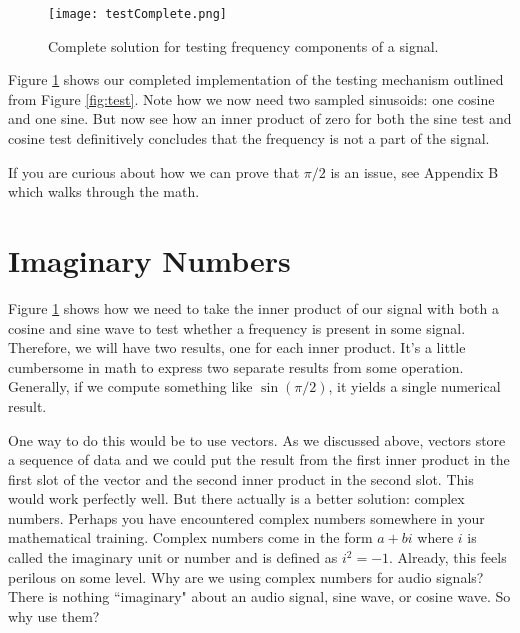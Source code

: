 \begin{figure}[h]
	\caption{Complete solution for testing frequency components of a signal.}
	\centering
	\texttt{[image: testComplete.png]}
	\label{fig:testComplete}
\end{figure}

Figure \ref{fig:testComplete} shows our completed implementation of the testing mechanism outlined from
Figure \ref{fig:test}.  Note how we now need two sampled sinusoids: one cosine and one sine.  But now see
how an inner product of zero for both the sine test and cosine test definitively concludes that the frequency
is not a part of the signal.

If you are curious about how we can prove that $\pi/2$ is an issue, see Appendix B which walks through the math.

\section*{Imaginary Numbers}

Figure \ref{fig:testComplete} shows how we need to take the inner product of our signal with both a cosine and
sine wave to test whether a frequency is present in some signal.  Therefore, we will have two results, one for
each inner product.  It's a little cumbersome in math to express two separate results from some operation.  
Generally, if we compute something like $\sin(\pi/2)$, it yields a single numerical result.  

One way to do this would be to use vectors.  As we discussed above, vectors store a sequence of data and we
could put the result from the first inner product in the first slot of the vector and the second inner product in 
the second slot.  This would work perfectly well.  But there actually is a better solution: complex numbers.
Perhaps you have encountered complex numbers somewhere in your mathematical training.  Complex numbers
come in the form $a + bi$ where $i$ is called the imaginary unit or number and is defined as $i^2 = -1$.  Already,
this feels perilous on some level.  Why are we using complex numbers for audio signals?  There is nothing
``imaginary" about an audio signal, sine wave, or cosine wave.  So why use them?

